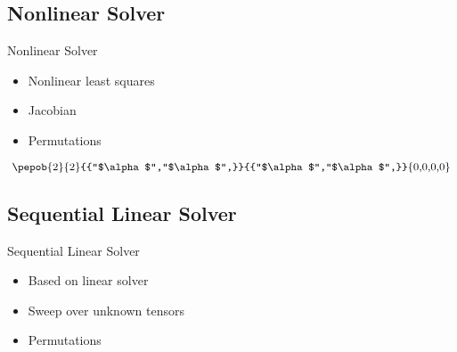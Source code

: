 

\subsection{Nonlinear Solver}
\begin{frame}{Nonlinear Solver}

    \begin{minipage}{0.5\textwidth}
        \begin{itemize}
            \item Nonlinear least squares
            \item Jacobian
            \item Permutations
        \end{itemize}
    \end{minipage}
    \begin{minipage}{0.49\textwidth}
        \begin{equation}
            \vcenter{\hbox{   {\pepob{2}{2}{{"$\alpha$","$\alpha$",}}{{"$\alpha$","$\alpha$",}}{{0,0,0,0}}} }}
        \end{equation}
    \end{minipage}

\end{frame}

\subsection{Sequential Linear Solver}
\begin{frame}{Sequential Linear Solver}
    \begin{itemize}
        \item Based on linear solver
        \item Sweep over unknown tensors
        \item Permutations
    \end{itemize}
\end{frame}